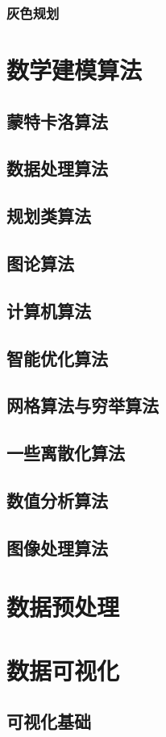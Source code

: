 \documentclass[openany]{progbookcn}
\begin{document}
\section{灰色规划}
\part{数学建模算法}
\chapter{蒙特卡洛算法}
\chapter{数据处理算法}
\chapter{规划类算法}
\chapter{图论算法}
\chapter{计算机算法}
\chapter{智能优化算法}
\chapter{网格算法与穷举算法}
\chapter{一些离散化算法}
\chapter{数值分析算法}
\chapter{图像处理算法}


\part{数据预处理}
\part{数据可视化}
\chapter{可视化基础}
\end{document}
